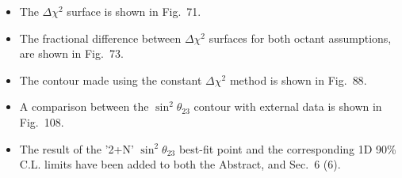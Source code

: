 \begin{itemize}
\begin{itemize}
    The 1D profile likelihoods are shown in Figs.\ {\color{red}67} and {\color{red}68}
    for $\sin^2\theta_{23}$ and $|\Delta m^2_{32}|$ respectively.
  \item The $\Delta \chi^2$ surface is shown in Fig.\ {\color{red}71}.
  \item The fractional difference between $\Delta \chi^2$ surfaces for both octant assumptions, are shown in Fig.\ {\color{red}73}.
  \item The contour made using the constant $\Delta \chi^2$ method is shown in Fig.\ {\color{red}88}.
  \item A comparison between the $\sin^2\theta_{23}$ contour with external data is shown in Fig.\ {\color{red}108}.
  \item The result of the '2+N' $\sin^2\theta_{23}$ best-fit point and the corresponding 1D 90\% C.L. limits have been added
    to both the Abstract, and Sec.\ 6 {\color{red}(6)}.
  \end{itemize}

\end{itemize}

